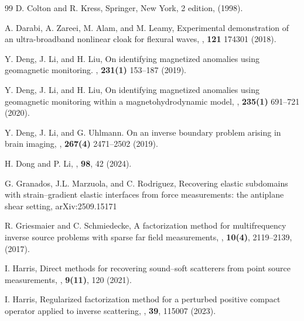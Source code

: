 \documentclass{article}
\numberwithin{equation}{section}
\begin{document}
{\begin{thebibliography}{99}
\newblock  D. Colton and R. Kress, 
\newblock  Springer, New York, 2 edition, (1998).


\newblock A. Darabi, A. Zareei, M. Alam, and M. Leamy, 
\newblock Experimental demonstration of an ultra-broadband nonlinear cloak for flexural waves,
, {\bf 121} 174301 (2018).


\newblock Y. Deng, J. Li, and H. Liu, 
\newblock On identifying magnetized anomalies using geomagnetic monitoring.
, {\bf 231(1)} 153--187 (2019).


\newblock Y. Deng, J. Li, and H. Liu, 
\newblock On identifying magnetized anomalies using geomagnetic monitoring within a magnetohydrodynamic model, 
, {\bf 235(1)}  691--721 (2020).


\newblock Y. Deng, J. Li, and G. Uhlmann. 
\newblock On an inverse boundary problem arising in brain imaging, 
, {\bf 267(4)} 2471--2502  (2019).


\newblock H. Dong and P. Li,
, {\bf 98}, 42 (2024).


\newblock G. Granados, J.L. Marzuola, and C. Rodriguez,
\newblock Recovering elastic subdomains with strain–gradient elastic interfaces from force measurements: the antiplane shear setting, 
\newblock arXiv:2509.15171


\newblock R. Griesmaier and C. Schmiedecke,
\newblock A factorization method for multifrequency inverse source problems with sparse far field measurements,
, {\bf 10(4)}, 2119--2139, (2017).


\newblock  I. Harris, 
\newblock  Direct methods for recovering sound--soft scatterers from point source measurements,
, {\bf 9(11)}, 120 (2021).


\newblock I. Harris, 
\newblock Regularized factorization method for a perturbed positive compact operator applied to inverse scattering,
, {\bf 39}, 115007 (2023).



\end{thebibliography}}
\end{document}
